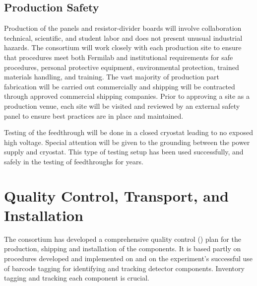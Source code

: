 \subsection{Production Safety}
\label{sec:fdsp-hv-prod-safety}

Production of the  panels and resistor-divider boards will involve collaboration technical, scientific, and student labor and  does not present unusual industrial hazards. The  consortium will work closely with each production site to ensure that procedures meet both Fermilab and institutional requirements for safe procedures, personal protective equipment, environmental protection, trained materials handling, and training. The vast majority of production part fabrication will be carried out commercially and shipping will be contracted through approved commercial shipping companies. Prior to approving a site as a production venue, each site will be visited and reviewed by an external safety panel to ensure best practices are in place and maintained. 

Testing of the  feedthrough will be done in a closed cryostat leading to no exposed high voltage.  Special attention will be given to the grounding between the power supply and cryostat.  This type of testing setup has been used successfully, and safely in the testing of  feedthroughs for years.

\clearpage
\section{Quality Control, Transport, and Installation}
\label{sec:fdsp-hv-transport}
The  consortium has developed a comprehensive quality control ()
plan for the production, shipping and installation of the   components. %
It is based partly on  procedures developed and implemented on  and on the \nova experiment's successful use of barcode tagging for identifying and tracking detector components.  Inventory tagging and tracking each component is crucial. %

